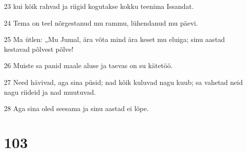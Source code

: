 \par 23 kui kõik rahvad ja riigid kogutakse kokku teenima Issandat.
\par 24 Tema on teel nõrgestanud mu rammu, lühendanud mu päevi.
\par 25 Ma ütlen: „Mu Jumal, ära võta mind ära keset mu eluiga; sinu aastad kestavad põlvest põlve!
\par 26 Muiste sa panid maale aluse ja taevas on su kätetöö.
\par 27 Need hävivad, aga sina püsid; nad kõik kuluvad nagu kuub; sa vahetad neid nagu riideid ja nad muutuvad.
\par 28 Aga sina oled seesama ja sinu aastad ei lõpe.

\chapter{103}

